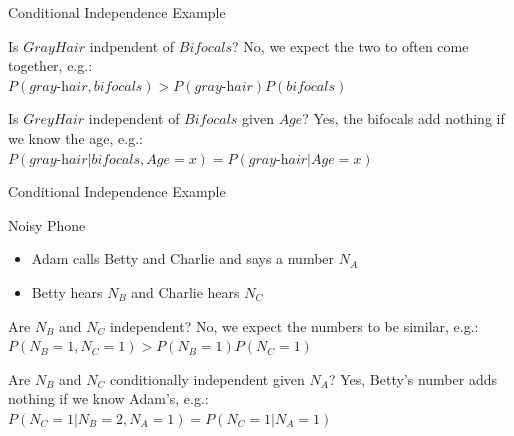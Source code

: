 \documentclass[14pt]{beamer}
\begin{document}
\begin{frame}{Conditional Independence Example}
	\begin{block}{Is $\textit{GrayHair}$ indpendent of $\textit{Bifocals}$?}
		\pause
		No, we expect the two to often come together, e.g.: \\[.5em]
		$P(\textit{gray-hair}, \textit{bifocals}) > P(\textit{gray-hair})P(\textit{bifocals})$
	\end{block}
	\pause
	\begin{block}{Is $\textit{GreyHair}$ independent of $\textit{Bifocals}$ given $\textit{Age}$?}
		\pause
		Yes, the bifocals add nothing if we know the age, e.g.: \\[.5em]
		$P(\textit{gray-hair}|\textit{bifocals},\textit{Age}=x) = P(\textit{gray-hair}|\textit{Age}=x)$
	\end{block}
\end{frame}
\begin{frame}{Conditional Independence Example}
	\begin{block}{Noisy Phone}
		\begin{itemize}
			\item Adam calls Betty and Charlie and says a number $N_{A}$
			\item Betty hears $N_{B}$ and Charlie hears $N_{C}$
		\end{itemize}
	\end{block}
	\pause
	\begin{block}{Are $N_{B}$ and $N_{C}$ independent?}
		\pause
		No, we expect the numbers to be similar, e.g.: \\[.5em]
		$P(N_{B}\!=\!1, N_{C}\!=\!1) > P(N_{B}\!=\!1)P(N_{C}\!=\!1)$
	\end{block}
	\pause
	\begin{block}{Are $N_{B}$ and $N_{C}$ conditionally independent given $N_{A}$?}
		\pause
		Yes, Betty's number adds nothing if we know Adam's, e.g.: \\[.5em]
		$P(N_{C}\!=\!1|N_{B}\!=\!2,N_{A}\!=\!1) = P(N_{C}\!=\!1|N_{A}\!=\!1)$
	\end{block}
\end{frame}
\end{document}
